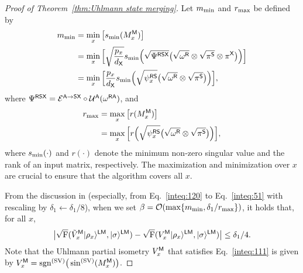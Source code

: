 \begin{proof}[Proof of Theorem~\ref{thm:Uhlmann state merging}]
Let $m_{\rm min}$ and $r_{\rm max}$ be defined by 
\begin{align}
\label{inteq:118}
    m_{\rm min}
    &= \min_x \big[s_{\rm min}(M_x^{\mathsf{M}})\big] \\
    &= \min_x \Big[\sqrt{\frac{p_x}{d_{\mathsf{X}}}}s_{\rm min}\Big(\sqrt{\Psi^{{\mathsf{R}}{\mathsf{S}}{\mathsf{X}}}}\big(\sqrt{\omega^{\mathsf{R}}}\otimes\sqrt{\pi^{\mathsf{S}}}\otimes\pi^{\mathsf{X}}\big)\Big)\Big] \\
    &= \min_x\Big[\frac{p_x}{d_{\mathsf{X}}}s_{\rm min}\Big(\sqrt{\psi_x^{{\mathsf{R}}{\mathsf{S}}}}\big(\sqrt{\omega^{\mathsf{R}}}\otimes\sqrt{\pi^{\mathsf{S}}}\big)\Big)\Big],
\end{align}
where $\Psi^{{\mathsf{R}}{\mathsf{S}}{\mathsf{X}}} = {\mathcal{E}}^{{\mathsf{A}}\rightarrow{\mathsf{S}}{\mathsf{X}}}\circ{\mathcal{U}}^{\mathsf{A}}(\omega^{{\mathsf{R}}{\mathsf{A}}})$, and
\begin{align}
\label{inteq:119}
    r_{\rm max} 
    &= \max_x\big[r(M_x^{\mathsf{M}})\big] \\
    &= \max_x\Big[r\Big(\sqrt{\psi_x^{{\mathsf{R}}{\mathsf{S}}}}\big(\sqrt{\omega^{\mathsf{R}}}\otimes\sqrt{\pi^{\mathsf{S}}}\big)\Big)\Big],
\end{align}
where $s_{\rm min}(\cdot)$ and $r(\cdot)$ denote the minimum non-zero singular value and the rank of an input matrix, respectively.
The maximization and minimization over $x$ are crucial to ensure that the algorithm covers all $x$.


From the discussion in  (especially, from Eq.~\eqref{inteq:120} to Eq.~\eqref{inteq:51} with rescaling by $\delta_1 \gets \delta_1/8$), when we set $\beta = {\mathcal{O}}(\max\{m_{\rm min}, \delta_1/r_{\rm max}\})$, it holds that, for all $x$, 
\begin{align}
\label{inteq:113}
    \big|\sqrt{{\mathrm{F}}}(\tilde{V}_x^{\mathsf{M}}|\rho_x\rangle^{{\mathsf{L}}{\mathsf{M}}}, |\sigma\rangle^{{\mathsf{L}}{\mathsf{M}}}) - \sqrt{{\mathrm{F}}}(V_x^{\mathsf{M}}|\rho_x\rangle^{{\mathsf{L}}{\mathsf{M}}}, |\sigma\rangle^{{\mathsf{L}}{\mathsf{M}}})\big| \leq \delta_1/4.
\end{align}
Note that the Uhlmann partial isometry $V_x^{\mathsf{M}}$ that satisfies Eq.~\eqref{inteq:111} is given by $V_x^{\mathsf{M}} = \mathrm{sgn}^{(\rm SV)}\big(\sin^{(\rm SV)}(M_x^{\mathsf{M}})\big)$.




\end{proof}
